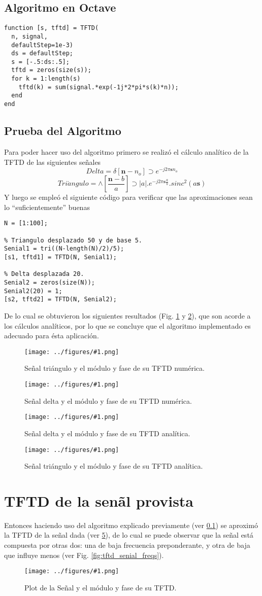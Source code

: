 \documentclass[letterpaper, 10 pt, conference]{ieeeconf}  %
\newcommand{\image}[2] {
  \begin{figure}[H]
    \centering
    \texttt{[image: ../figures/\#1.png]}
    \caption{#2}
    \label{fig:#1}
  \end{figure}
}
\begin{document}
\subsection{Algoritmo en Octave}
\label{tftd_function}
\begin{lstlisting}[style=Matlab-editor] 
function [s, tftd] = TFTD(
  n, signal,
  defaultStep=1e-3)
  ds = defaultStep;
  s = [-.5:ds:.5];
  tftd = zeros(size(s));
  for k = 1:length(s)
    tftd(k) = sum(signal.*exp(-1j*2*pi*s(k)*n));
  end
end
\end{lstlisting}

\subsection{Prueba del Algoritmo}
Para poder hacer uso del algoritmo primero se realiz\'o el c\'alculo analítico de la TFTD de las siguientes se\~{n}ales
\[
  Delta = \delta[\textbf{n}-n_o] \supset e^{-j2{\pi}\textbf{s}n_o}
\]
\[
  Tri\acute{a}ngulo = \wedge[\frac{\textbf{n}-b}{a}] \supset |a|.e^{-j2{\pi}\textbf{s}\frac{a}{b}}.sinc^2(a\textbf{s})
\]
Y luego se emple\'o el siguiente c\'odigo para verificar que las aproximaciones sean lo ``suficientemente'' buenas

\begin{lstlisting}[style=Matlab-editor]
N = [1:100];

% Triangulo desplazado 50 y de base 5.
Senial1 = tri((N-length(N)/2)/5);
[s1, tftd1] = TFTD(N, Senial1);

% Delta desplazada 20.
Senial2 = zeros(size(N));
Senial2(20) = 1;
[s2, tftd2] = TFTD(N, Senial2);
\end{lstlisting}

De lo cual se obtuvieron los siguientes resultados (Fig. \ref{fig:triangulo_tftd} y \ref{fig:delta_tftd}), que son acorde a los c\'alculos analíticos, por lo que se concluye que el algoritmo implementado es adecuado para \'esta aplicaci\'on.

\image{triangulo_tftd}{Se\~{n}al tri\'angulo y el m\'odulo y fase de su TFTD num\'erica.}
\image{delta_tftd}{Se\~{n}al delta y el m\'odulo y fase de su TFTD num\'erica.}
\image{delta_tftd_analitica}{Se\~{n}al delta y el m\'odulo y fase de su TFTD anal\'itica.}
\image{triangulo_tftd_analitica}{Se\~{n}al tri\'angulo y el m\'odulo y fase de su TFTD anal\'itica.}

\section{TFTD de la sen\~al provista}
Entonces haciendo uso del algoritmo explicado previamente (ver \ref{tftd_function}) se aproxim\'o la TFTD de la se\~{n}al dada (ver \ref{fig:senial_y_su_tftd}), de lo cual se puede observar que la se\~{n}al est\'a compuesta por otras dos: una de baja frecuencia preponderante, y otra de baja que influye menos (ver Fig. \ref{fig:tftd_senial_freqs}).
\image{senial_y_su_tftd}{Plot de la Se\~{n}al y el m\'odulo y fase de su TFTD.}
\end{document}
